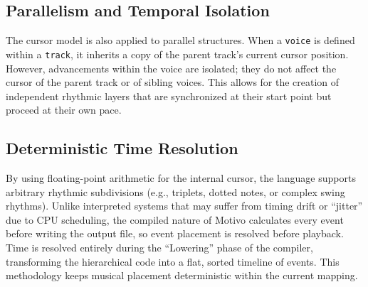 \subsection{Parallelism and Temporal Isolation}\label{detail-subsec:parallelism-and-temporal-isolation}

The cursor model is also applied to parallel structures.
When a \texttt{voice} is defined within a \texttt{track}, it inherits a copy of the parent track's current cursor
position.
However, advancements within the voice are isolated; they do not affect the cursor of the parent track or of sibling
voices.
This allows for the creation of independent rhythmic layers that are synchronized at their start point but proceed at
their own pace.

\subsection{Deterministic Time Resolution}\label{detail-subsec:deterministic-time-resolution}

By using floating-point arithmetic for the internal cursor, the language supports arbitrary rhythmic subdivisions
(e.g., triplets, dotted notes, or complex swing rhythms).
Unlike interpreted systems that may suffer from timing drift or ``jitter'' due to CPU scheduling, the compiled nature of
Motivo calculates every event before writing the output file, so event placement is resolved before playback.
Time is resolved entirely during the ``Lowering'' phase of the compiler, transforming the hierarchical code into a flat,
sorted timeline of events.
This methodology keeps musical placement deterministic within the current mapping.

